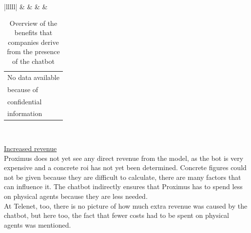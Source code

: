 \begin{table}[!htb]
\begin{tabular}{|lllll|}
		                      &                                                   &       &                                                                                               & \begin{tabular}[c]{@{}l@{}}No data available\\ because of \\ confidential\\ information\end{tabular}                                                             \\ \hline
	\end{tabular}
	\caption{Overview of the benefits that companies derive from the presence of the chatbot}
\end{table}
\ul{Increased revenue}\\
Proximus does not yet see any direct revenue from the model, as the bot is very expensive and a concrete \acrshort{roi} has not yet been determined. Concrete figures could not be given because they are difficult to calculate, there are many factors that can influence it. The chatbot indirectly ensures that Proximus has to spend less on physical agents because they are less needed.\\
\break
At Telenet, too, there is no picture of how much extra revenue was caused by the chatbot, but here too, the fact that fewer costs had to be spent on physical agents was mentioned.\\
